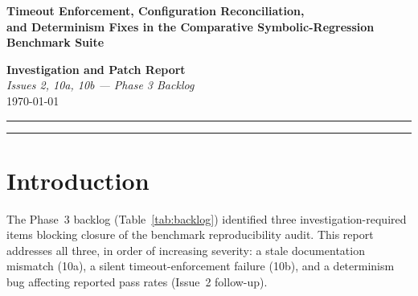 \documentclass[11pt]{article}
\newcommand{\jmlrtitle}[1]{
  \begin{center}
    {\LARGE\bfseries #1}
  \end{center}
  \vspace{0.3cm}
}
\begin{document}
\thispagestyle{empty}

\jmlrtitle{Timeout Enforcement, Configuration Reconciliation,\\ and Determinism Fixes in the Comparative Symbolic-Regression Benchmark Suite}

\begin{center}
\textbf{Investigation and Patch Report} \\[2pt]
\textit{Issues 2, 10a, 10b — Phase 3 Backlog} \\[6pt]
\today
\end{center}

\vspace{0.4cm}
\noindent\rule{\textwidth}{0.5pt}

\begin{abstract}
\noindent
This report documents the investigation and resolution of three open items
from the Phase 3 backlog of the comparative symbolic-regression benchmark
suite: (i) an unresolved configuration discrepancy between two write-ups
reporting 900\,s and 1100\,s PySR timeouts for the same sweep (Issue~10a);
(ii) a timeout-enforcement bug in which a stated 300\,s per-test limit
failed to prevent a 27{,}574\,s hang (Issue~10b); and (iii) a
per-process-randomized \texttt{hash()} seeding bug affecting five
unseeded or inconsistently-seeded neural-network code paths (Issue~2,
follow-up). We report root causes, the code-level fixes applied, and
benchmark results recomputed from the post-fix run logs across noiseless,
noisy, and noise-sweep protocols. Issue~10a is closed as a documentation
reconciliation; Issue~10b is closed with a process-group isolation fix to
\texttt{\_run\_pysr\_in\_subprocess}; Issue~2's follow-up patches five
call sites across two files, verified by static grep and successful
compilation.
\end{abstract}

\noindent\rule{\textwidth}{0.4pt}
\vspace{0.3cm}

\section{Introduction}

The Phase~3 backlog (Table~\ref{tab:backlog}) identified three
investigation-required items blocking closure of the benchmark
reproducibility audit. This report addresses all three, in order of
increasing severity: a stale documentation mismatch (10a), a silent
timeout-enforcement failure (10b), and a determinism bug affecting
reported pass rates (Issue~2 follow-up).
\end{document}
